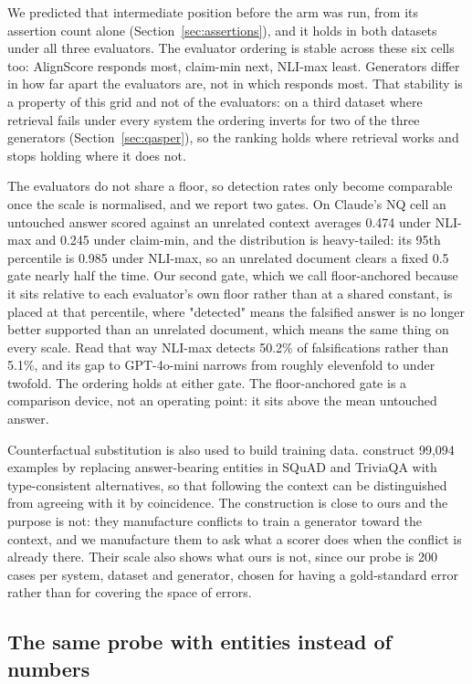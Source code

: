 \documentclass[11pt]{article}
\begin{document}
We predicted that intermediate position before the arm was run, from its assertion count alone (Section~\ref{sec:assertions}), and it holds in both datasets under all three evaluators. The evaluator ordering is stable across these six cells too: AlignScore responds most, claim-min next, NLI-max least. Generators differ in how far apart the evaluators are, not in which responds most. That stability is a property of this grid and not of the evaluators: on a third dataset where retrieval fails under every system the ordering inverts for two of the three generators (Section~\ref{sec:qasper}), so the ranking holds where retrieval works and stops holding where it does not.

The evaluators do not share a floor, so detection rates only become comparable once the scale is normalised, and we report two gates. On Claude's NQ cell an untouched answer scored against an unrelated context averages 0.474 under NLI-max and 0.245 under claim-min, and the distribution is heavy-tailed: its 95th percentile is 0.985 under NLI-max, so an unrelated document clears a fixed 0.5 gate nearly half the time. Our second gate, which we call floor-anchored because it sits relative to each evaluator's own floor rather than at a shared constant, is placed at that percentile, where "detected" means the falsified answer is no longer better supported than an unrelated document, which means the same thing on every scale. Read that way NLI-max detects 50.2\% of falsifications rather than 5.1\%, and its gap to GPT-4o-mini narrows from roughly elevenfold to under twofold. The ordering holds at either gate. The floor-anchored gate is a comparison device, not an operating point: it sits above the mean untouched answer.



Counterfactual substitution is also used to build training data. \citet{ju-etal-2026} construct 99,094 examples by replacing answer-bearing entities in SQuAD and TriviaQA with type-consistent alternatives, so that following the context can be distinguished from agreeing with it by coincidence. The construction is close to ours and the purpose is not: they manufacture conflicts to train a generator toward the context, and we manufacture them to ask what a scorer does when the conflict is already there. Their scale also shows what ours is not, since our probe is 200 cases per system, dataset and generator, chosen for having a gold-standard error rather than for covering the space of errors.


\subsection{The same probe with entities instead of numbers}
\label{sec:entity}
\end{document}
